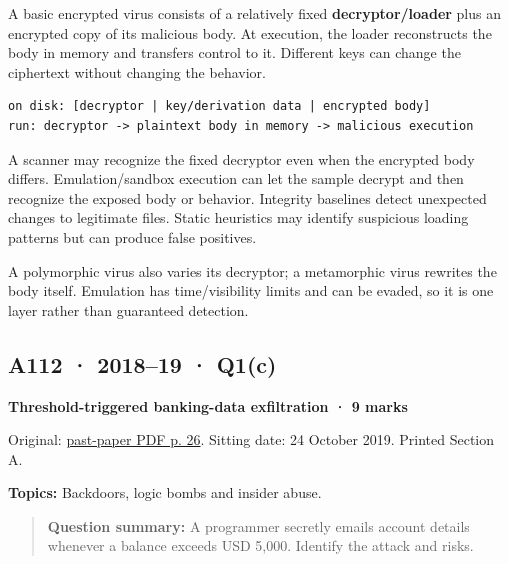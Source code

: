 \documentclass[11pt,a4paper]{article}
\begin{document}
A basic encrypted virus consists of a relatively fixed \textbf{decryptor/\allowbreak{}loader} plus an encrypted copy of its malicious body. At execution,\allowbreak{} the loader reconstructs the body in memory and transfers control to it. Different keys can change the ciphertext without changing the behavior.



\begin{Verbatim}[breaklines=true,breakanywhere=true,fontsize=\small,frame=single,rulecolor=\color{PanelBorder}]
on disk: [decryptor | key/derivation data | encrypted body]
run: decryptor -> plaintext body in memory -> malicious execution
\end{Verbatim}

A scanner may recognize the fixed decryptor even when the encrypted body differs. Emulation/\allowbreak{}sandbox execution can let the sample decrypt and then recognize the exposed body or behavior. Integrity baselines detect unexpected changes to legitimate files. Static heuristics may identify suspicious loading patterns but can produce false positives.


A polymorphic virus also varies its decryptor; a metamorphic virus rewrites the body itself. Emulation has time/\allowbreak{}visibility limits and can be evaded,\allowbreak{} so it is one layer rather than guaranteed detection.




\clearpage
\subsection{A112 · 2018–19 · Q1(c)}\label{a112}

\textbf{Threshold-triggered banking-data exfiltration · 9 marks}


Original: \href{../../CSE405-Security_Merged.pdf\#page=26}{past-paper PDF p. 26}. Sitting date: 24 October 2019. Printed Section A.


\textbf{Topics:} Backdoors,\allowbreak{} logic bombs and insider abuse.



\begin{quote}\small

\textbf{Question summary:} A programmer secretly emails account details whenever a balance exceeds USD 5,\allowbreak{}000. Identify the attack and risks.



\end{quote}
\end{document}
